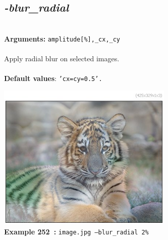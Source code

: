 \documentclass[a4paper,11pt,twoside]{book}
\begin{document}
\subsection{\emph{-blur\_radial} }\vspace*{-0.5em}
~\\\textbf{Arguments: } 
{\small \texttt{amplitude[\%],\_cx,\_cy}}\\~\\
Apply radial blur on selected images.
~\\~\\\textbf{Default values}: {\small \texttt{'cx=cy=0.5'.}}
\begin{center}\includegraphics[keepaspectratio=true,height=7cm,width=\textwidth]{img/gmic_def252.jpg}\\
{\footnotesize \textbf{Example 252~:} \texttt{image.jpg --blur\_radial 2\%}}
\end{center}
\end{document}
